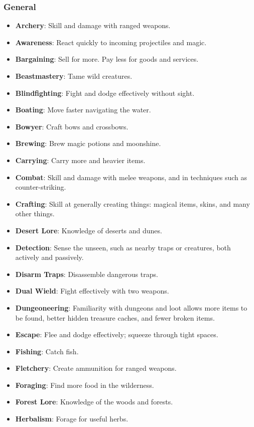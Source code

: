 \subsubsection{General}
\begin{itemize}
\item {\bf Archery}: Skill and damage with ranged weapons.
\item {\bf Awareness}: React quickly to incoming projectiles and magic.
\item {\bf Bargaining}: Sell for more.  Pay less for goods and services.
\item {\bf Beastmastery}: Tame wild creatures.
\item {\bf Blindfighting}: Fight and dodge effectively without sight. 
\item {\bf Boating}: Move faster navigating the water.
\item {\bf Bowyer}: Craft bows and crossbows.
\item {\bf Brewing}: Brew magic potions and moonshine. 
\item {\bf Carrying}: Carry more and heavier items.
\item {\bf Combat}: Skill and damage with melee weapons, and in techniques such as counter-striking.
\item {\bf Crafting}: Skill at generally creating things: magical items, skins, and many other things.
\item {\bf Desert Lore}: Knowledge of deserts and dunes. 
\item {\bf Detection}: Sense the unseen, such as nearby traps or creatures, both actively and passively.
\item {\bf Disarm Traps}: Disassemble dangerous traps. 
\item {\bf Dual Wield}: Fight effectively with two weapons. 
\item {\bf Dungeoneering}: Familiarity with dungeons and loot allows more items to be found, better hidden treasure caches, and fewer broken items.
\item {\bf Escape}: Flee and dodge effectively; squeeze through tight spaces.
\item {\bf Fishing}: Catch fish.
\item {\bf Fletchery}: Create ammunition for ranged weapons.
\item {\bf Foraging}: Find more food in the wilderness.
\item {\bf Forest Lore}: Knowledge of the woods and forests. 
\item {\bf Herbalism}: Forage for useful herbs. 

\end{itemize}
